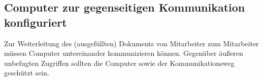 \subsection{Computer zur gegenseitigen Kommunikation konfiguriert}
Zur Weiterleitung des (ausgefüllten) Dokuments von Mitarbeiter zum Mitarbeiter müssen Computer untereinander kommunizieren können. Gegenüber äußeren unbefugten Zugriffen sollten die Computer sowie der Kommunikationsweg geschützt sein.